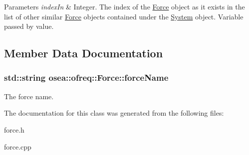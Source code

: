 \begin{DoxyParams}{Parameters}
{\em index\-In} & Integer. The index of the \hyperlink{classosea_1_1ofreq_1_1_force}{Force} object as it exists in the list of other similar \hyperlink{classosea_1_1ofreq_1_1_force}{Force} objects contained under the \hyperlink{classosea_1_1ofreq_1_1_system}{System} object. Variable passed by value. \\
\hline
\end{DoxyParams}


\subsection{Member Data Documentation}
\hypertarget{classosea_1_1ofreq_1_1_force_af7cab6c2ebbe013f407570136a5cb8e7}{
\subsubsection[{force\-Name}]{\setlength{\rightskip}{0pt plus 5cm}std\-::string osea\-::ofreq\-::\-Force\-::force\-Name\hspace{0.3cm}{\ttfamily [protected]}}}\label{classosea_1_1ofreq_1_1_force_af7cab6c2ebbe013f407570136a5cb8e7}
The force name. 

The documentation for this class was generated from the following files\-:\begin{DoxyCompactItemize}
\item 
force.\-h\item 
force.\-cpp\end{DoxyCompactItemize}
